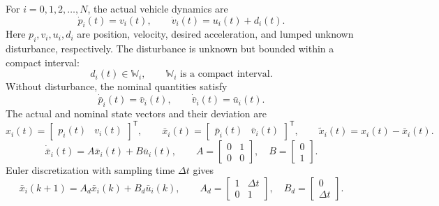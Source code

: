 \documentclass{article}
\begin{document}
For $i=0,1,2,\ldots,N$, the actual vehicle dynamics are
\begin{equation}
\dot p_i(t)=v_i(t),\qquad
\dot v_i(t)=u_i(t)+d_i(t).
\tag{1}
\end{equation}
Here $p_i,v_i,u_i,d_i$ are position, velocity, desired acceleration, and lumped unknown disturbance, respectively. The disturbance is unknown but bounded within a compact interval:
\[
d_i(t)\in\mathbb W_i,\qquad \mathbb W_i\text{ is a compact interval}.
\]
Without disturbance, the nominal quantities satisfy
\begin{equation}
\dot{\bar p}_i(t)=\bar v_i(t),\qquad
\dot{\bar v}_i(t)=\bar u_i(t).
\tag{2}
\end{equation}
The actual and nominal state vectors and their deviation are
\[
x_i(t)=\begin{bmatrix}p_i(t)&v_i(t)\end{bmatrix}^{\mathsf T},\qquad
\bar x_i(t)=\begin{bmatrix}\bar p_i(t)&\bar v_i(t)\end{bmatrix}^{\mathsf T},\qquad
\widetilde x_i(t)=x_i(t)-\bar x_i(t).
\]
\begin{equation}
\dot{\bar x}_i(t)=A\bar x_i(t)+B\bar u_i(t),\qquad
A=\begin{bmatrix}0&1\\0&0\end{bmatrix},\quad
B=\begin{bmatrix}0\\1\end{bmatrix}.
\tag{3}
\end{equation}
Euler discretization with sampling time $\Delta t$ gives
\begin{equation}
\bar x_i(k+1)=A_d\bar x_i(k)+B_d\bar u_i(k),\qquad
A_d=\begin{bmatrix}1&\Delta t\\0&1\end{bmatrix},\quad
B_d=\begin{bmatrix}0\\\Delta t\end{bmatrix}.
\tag{13}
\end{equation}
\end{document}
